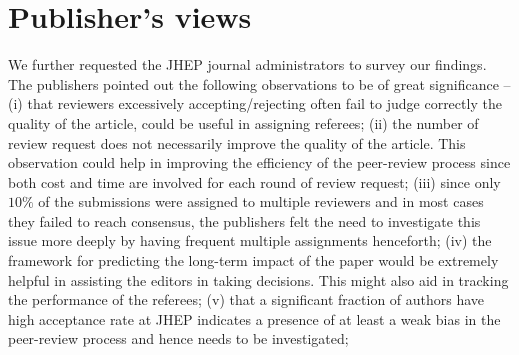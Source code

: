 \noindent
\section{Publisher's views}
\label{implication}
We further requested the JHEP journal administrators to survey our findings. The publishers pointed out the following observations to be of great significance -- 
(i) that reviewers excessively accepting/rejecting often fail to judge correctly the quality of the article, could be useful in assigning referees;
(ii) the number of review request does not necessarily improve the quality of the article. This observation could help in improving the efficiency of the peer-review process since both cost and time are involved for each round of review request; 
(iii) since only $10\%$ of the submissions were assigned to multiple reviewers and in most cases they failed to reach consensus, the publishers felt the need to investigate this issue more deeply by having frequent multiple assignments henceforth; 
(iv) the framework for predicting the long-term impact of the paper would be extremely helpful in assisting the editors in taking decisions. This might also aid in tracking the performance of the referees;
(v) that a significant fraction of authors have high acceptance rate at JHEP indicates a presence of at least a weak bias in the peer-review process and hence needs to be investigated;
\medskip